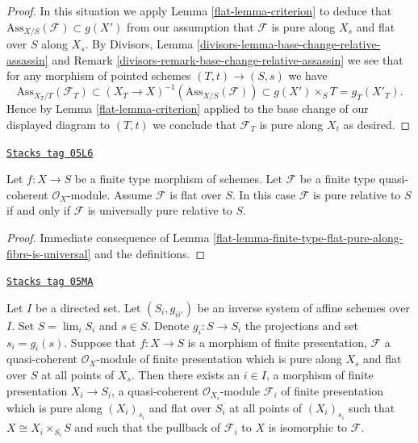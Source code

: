 \begin{proof}
\medskip\noindent
In this situation we apply
Lemma \ref{flat-lemma-criterion}
to deduce that $\text{Ass}_{X/S}(\mathcal{F}) \subset g(X')$
from our assumption that $\mathcal{F}$ is pure along $X_s$
and flat over $S$ along $X_s$. By
Divisors, Lemma \ref{divisors-lemma-base-change-relative-assassin} and
Remark \ref{divisors-remark-base-change-relative-assassin}
we see that for any morphism of pointed schemes
$(T, t) \to (S, s)$ we have
$$
\text{Ass}_{X_T/T}(\mathcal{F}_T) \subset
(X_T \to X)^{-1}(\text{Ass}_{X/S}(\mathcal{F})) \subset
g(X') \times_S T = g_T(X'_T).
$$
Hence by
Lemma \ref{flat-lemma-criterion}
applied to the base change of our displayed diagram to $(T, t)$
we conclude that $\mathcal{F}_T$ is pure along $X_t$ as desired.
\end{proof}

\begin{lemma}
\label{flat-lemma-finite-type-flat-pure-is-universal}
\href{https://stacks.math.columbia.edu/tag/05L6}{\texttt{Stacks tag 05L6}}

Let $f : X \to S$ be a finite type morphism of schemes.
Let $\mathcal{F}$ be a finite type quasi-coherent $\mathcal{O}_X$-module.
Assume $\mathcal{F}$ is flat over $S$. In this case
$\mathcal{F}$ is pure relative to $S$ if and only if $\mathcal{F}$
is universally pure relative to $S$.
\end{lemma}

\begin{proof}

Immediate consequence of
Lemma \ref{flat-lemma-finite-type-flat-pure-along-fibre-is-universal}
and the definitions.
\end{proof}

\begin{lemma}
\label{flat-lemma-limit-purity}
\href{https://stacks.math.columbia.edu/tag/05MA}{\texttt{Stacks tag 05MA}}

Let $I$ be a directed set.
Let $(S_i, g_{ii'})$ be an inverse system of affine schemes over $I$.
Set $S = \lim_i S_i$ and $s \in S$.
Denote $g_i : S \to S_i$ the projections and set $s_i = g_i(s)$.
Suppose that $f : X \to S$ is a morphism of finite presentation,
$\mathcal{F}$ a quasi-coherent $\mathcal{O}_X$-module of finite presentation
which is pure along $X_s$ and flat over $S$ at all points of $X_s$.
Then there exists an $i \in I$, a morphism of finite presentation
$X_i \to S_i$, a quasi-coherent $\mathcal{O}_{X_i}$-module $\mathcal{F}_i$
of finite presentation which is pure along $(X_i)_{s_i}$ and flat over $S_i$
at all points of $(X_i)_{s_i}$ such that $X \cong X_i \times_{S_i} S$
and such that the pullback of $\mathcal{F}_i$ to $X$ is isomorphic
to $\mathcal{F}$.
\end{lemma}

